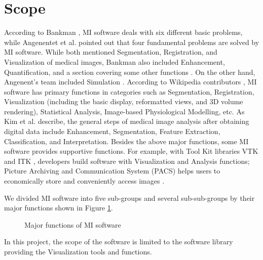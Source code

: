 \section{Scope}
\label{sec_scope}
According to Bankman \cite{Bankman2000}, MI software deals with six different basic problems, while Angenentet et al. \cite{Angenent2006} pointed out that four fundamental problems are solved by MI software. While both mentioned Segmentation, Registration, and Visualization of medical images, Bankman also included Enhancement, Quantification, and a section covering some other functions \cite{Bankman2000}. On the other hand, Angenent's team included Simulation \cite{Angenent2006}. According to Wikipedia contributors \cite{enwiki:1034877594}, MI software has primary functions in categories such as Segmentation, Registration, Visualization (including the basic display, reformatted views, and 3D volume rendering), Statistical Analysis, Image-based Physiological Modelling, etc. As Kim et al. \cite{Kim2011} describe, the general steps of medical image analysis after obtaining digital data include Enhancement, Segmentation, Feature Extraction, Classification, and Interpretation. Besides the above major functions, some MI software provides supportive functions. For example, with Tool Kit libraries VTK \cite{SchroederEtAl2006} and ITK \cite{McCormick2014}, developers build software with Visualization and Analysis functions; Picture Archiving and Communication System (PACS) helps users to economically store and conveniently access images \cite{Choplin1992}. 

We divided MI software into five sub-groups and several sub-sub-groups by their major functions shown in Figure \ref{fig_mi_functions}.

\begin{figure}
\centering
{}
\caption{Major functions of MI software}
\label{fig_mi_functions}
\end{figure}

In this project, the scope of the software is limited to the software library providing the Visualization tools and functions.
